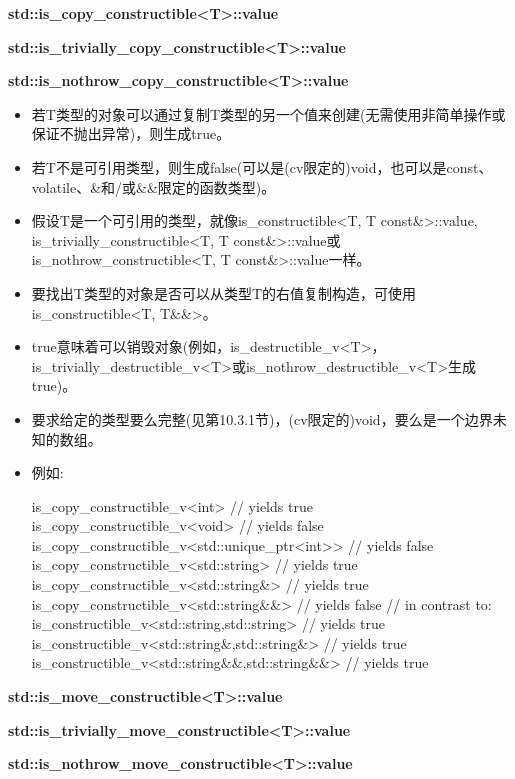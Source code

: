 \textbf{std::is\_copy\_constructible<T>::value}

\textbf{std::is\_trivially\_copy\_constructible<T>::value}

\textbf{std::is\_nothrow\_copy\_constructible<T>::value}

\begin{itemize}
\item 
若T类型的对象可以通过复制T类型的另一个值来创建(无需使用非简单操作或保证不抛出异常)，则生成true。

\item 
若T不是可引用类型，则生成false(可以是(cv限定的)void，也可以是const、volatile、\&和/或\&\&限定的函数类型)。

\item 
假设T是一个可引用的类型，就像is\_constructible<T, T const\&>::value, is\_trivially\_constructible<T, T const\&>::value或is\_nothrow\_constructible<T, T const\&>::value一样。

\item 
要找出T类型的对象是否可以从类型T的右值复制构造，可使用is\_constructible<T, T\&\&>。

\item 
true意味着可以销毁对象(例如，is\_destructible\_v<T>，is\_trivially\_destructible\_v<T>或is\_nothrow\_destructible\_v<T>生成true)。

\item 
要求给定的类型要么完整(见第10.3.1节)，(cv限定的)void，要么是一个边界未知的数组。

\item 
例如:
\begin{cpp}
is_copy_constructible_v<int> // yields true
is_copy_constructible_v<void> // yields false
is_copy_constructible_v<std::unique_ptr<int>> // yields false
is_copy_constructible_v<std::string> // yields true
is_copy_constructible_v<std::string&> // yields true
is_copy_constructible_v<std::string&&> // yields false
// in contrast to:
is_constructible_v<std::string,std::string> // yields true
is_constructible_v<std::string&,std::string&> // yields true
is_constructible_v<std::string&&,std::string&&> // yields true
\end{cpp}

\end{itemize}

\textbf{std::is\_move\_constructible<T>::value}

\textbf{std::is\_trivially\_move\_constructible<T>::value}

\textbf{std::is\_nothrow\_move\_constructible<T>::value}

